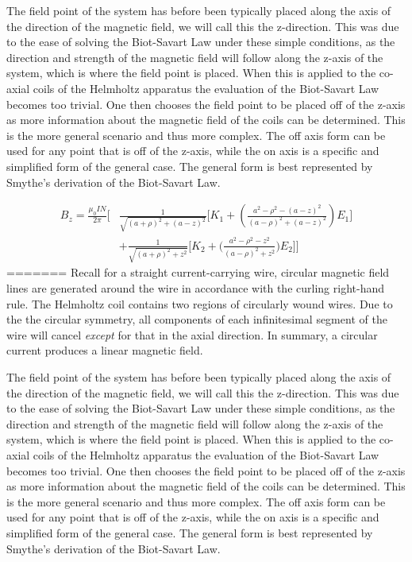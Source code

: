 \documentclass[a4paper]{article}
\begin{document}
The field point of the system has before been typically placed along
the axis of the direction of the magnetic field, we will call this the
z-direction. This was due to the ease of solving the Biot-Savart Law
under these simple conditions, as the direction and strength of the
magnetic field will follow along the z-axis of the system, which is
where the field point is placed. When this is applied to the co-axial
coils of the Helmholtz apparatus the evaluation of the Biot-Savart Law
becomes too trivial. One then chooses the field point to be placed off
of the z-axis as more information about the magnetic field of the
coils can be determined. This is the more general scenario and thus
more complex. The off axis form can be used for any point that is off
of the z-axis, while the on axis is a specific and simplified form of
the general case. The general form is best represented by Smythe's
derivation of the Biot-Savart Law.

\begin{align*} 
B_z = \frac{\mu_0IN}{2\pi}
\Big[&
    \frac{1}{\sqrt{(a+\rho)^2 + (a-z)^2}}
    \big[
        K_1 + \left(\frac{a^2 -\rho^2 - (a - z)^2}{(a-\rho)^2 + (a - z)^2} \right) E_1 
    \big]\\
    & + \frac{1}{\sqrt{(a + \rho)^2 + z^2}}
    \big[
        K_2 + \big(\frac{a^2 - \rho^2 - z^2}{(a - \rho)^2 + z^2}\big) E_2 
    \big] 
\Big]
\end{align*}
=======
\qq Recall for a straight current-carrying wire, circular magnetic field lines are
generated around the wire in accordance with the curling right-hand rule. The
Helmholtz coil contains two regions of circularly wound wires. Due to the the
circular symmetry, all components of each infinitesimal segment of the wire will
cancel \textit{except} for that in the axial direction. In summary, a circular
current produces a linear magnetic field.

\qq The field point of the system has before been typically placed along the axis of
the direction of the magnetic field, we will call this the z-direction. This was
due to the ease of solving the Biot-Savart Law under these simple conditions, as
the direction and strength of the magnetic field will follow along the z-axis of
the system, which is where the field point is placed. When this is applied to
the co-axial coils of the Helmholtz apparatus the evaluation of the Biot-Savart
Law becomes too trivial. One then chooses the field point to be placed off of
the z-axis as more information about the magnetic field of the coils can be
determined. This is the more general scenario and thus more complex. The off
axis form can be used for any point that is off of the z-axis, while the on axis
is a specific and simplified form of the general case. The general form is best
represented by Smythe's derivation of the Biot-Savart Law.
\end{document}
